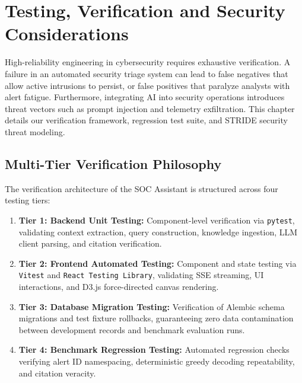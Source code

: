 \chapter{Testing, Verification and Security Considerations}
\label{chap:testing_security}

High-reliability engineering in cybersecurity requires exhaustive verification. A failure in an automated security triage system can lead to false negatives that allow active intrusions to persist, or false positives that paralyze analysts with alert fatigue. Furthermore, integrating AI into security operations introduces threat vectors such as prompt injection and telemetry exfiltration. This chapter details our verification framework, regression test suite, and STRIDE security threat modeling.

\section{Multi-Tier Verification Philosophy}
\label{sec:verification_philosophy}
The verification architecture of the SOC Assistant is structured across four testing tiers:
\begin{enumerate}[itemsep=1pt,topsep=2pt]
    \item \textbf{Tier 1: Backend Unit Testing:} Component-level verification via \texttt{pytest}, validating context extraction, query construction, knowledge ingestion, LLM client parsing, and citation verification.
    \item \textbf{Tier 2: Frontend Automated Testing:} Component and state testing via \texttt{Vitest} and \texttt{React Testing Library}, validating SSE streaming, UI interactions, and D3.js force-directed canvas rendering.
    \item \textbf{Tier 3: Database Migration Testing:} Verification of Alembic schema migrations and test fixture rollbacks, guaranteeing zero data contamination between development records and benchmark evaluation runs.
    \item \textbf{Tier 4: Benchmark Regression Testing:} Automated regression checks verifying alert ID namespacing, deterministic greedy decoding repeatability, and citation veracity.
\end{enumerate}

